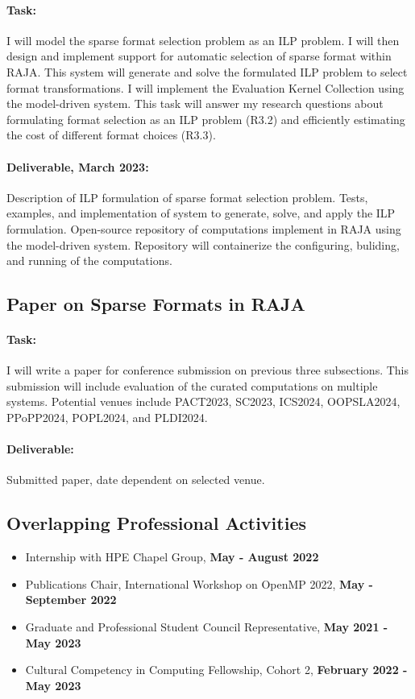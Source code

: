 \documentclass{article}
\begin{document}
\paragraph{Task:}
I will model the sparse format selection problem as an ILP problem.
I will then design and implement support for automatic selection of sparse format within RAJA.
This system will generate and solve the formulated ILP problem to select format transformations.
I will implement the Evaluation Kernel Collection using the model-driven system.
This task will answer my research questions about formulating format selection as an ILP problem (R3.2) and efficiently estimating the cost of different format choices (R3.3).

\paragraph{Deliverable, March 2023:}
Description of ILP formulation of sparse format selection problem.
Tests, examples, and implementation of system to generate, solve, and apply the ILP formulation.
Open-source repository of computations implement in RAJA using the model-driven system.
Repository will containerize the configuring, buliding, and running of the computations. 

\subsection{Paper on Sparse Formats in RAJA}

\paragraph{Task:}
I will write a paper for conference submission on previous three subsections. 
This submission will include evaluation of the curated computations on multiple systems.
Potential venues include PACT2023, SC2023, ICS2024,  OOPSLA2024, PPoPP2024, POPL2024, and PLDI2024.


\paragraph{Deliverable:} Submitted paper, date dependent on selected venue.


\subsection{Overlapping Professional Activities}
\begin{itemize}
\item Internship with HPE Chapel Group, \textbf{May - August 2022} 
\item Publications Chair, International Workshop on OpenMP 2022, \textbf{May - September 2022}
\item Graduate and Professional Student Council Representative, \textbf{May 2021 - May 2023}
\item Cultural Competency in Computing Fellowship, Cohort 2, \textbf{February 2022 - May 2023}
\end{itemize}
\end{document}
